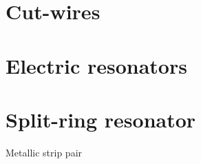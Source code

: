 \section{Cut-wires} \label{section_cutwires} %





\section{Electric resonators} \label{section_esrr} %







\section{Split-ring resonator} \label{section_srr} %
Metallic strip pair






